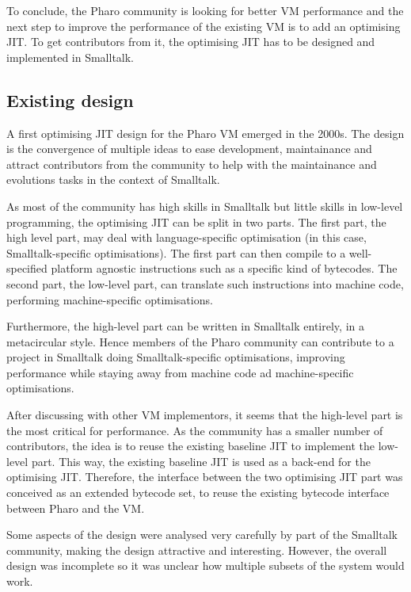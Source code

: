 \documentclass[a4paper,12pt,twoside]{../includes/ThesisStyle}
\begin{document}
To conclude, the Pharo community is looking for better VM performance and the next step to improve the performance of the existing VM is to add an optimising JIT. To get contributors from it, the optimising JIT has to be designed and implemented in Smalltalk.

\subsection{Existing design}

A first optimising JIT design for the Pharo VM emerged in the 2000s. The design is the convergence of multiple ideas to ease development, maintainance and attract contributors from the community to help with the maintainance and evolutions tasks in the context of Smalltalk.

As most of the community has high skills in Smalltalk but little skills in low-level programming, the optimising JIT can be split in two parts. The first part, the high level part, may deal with language-specific optimisation (in this case, Smalltalk-specific optimisations). The first part can then compile to a well-specified platform agnostic instructions such as a specific kind of bytecodes. The second part, the low-level part, can translate such instructions into machine code, performing machine-specific optimisations.

Furthermore, the high-level part can be written in Smalltalk entirely, in a metacircular style. Hence members of the Pharo community can contribute to a project in Smalltalk doing Smalltalk-specific optimisations, improving performance while staying away from machine code ad machine-specific optimisations. 

After discussing with other VM implementors, it seems that the high-level part is the most critical for performance. As the community has a smaller number of contributors, the idea is to reuse the existing baseline JIT to implement the low-level part. This way, the existing baseline JIT is used as a back-end for the optimising JIT. Therefore, the interface between the two optimising JIT part was conceived as an extended bytecode set, to reuse the existing bytecode interface between Pharo and the VM.

Some aspects of the design were analysed very carefully by part of the Smalltalk community, making the design attractive and interesting. However, the overall design was incomplete so it was unclear how multiple subsets of the system would work. 
\end{document}
